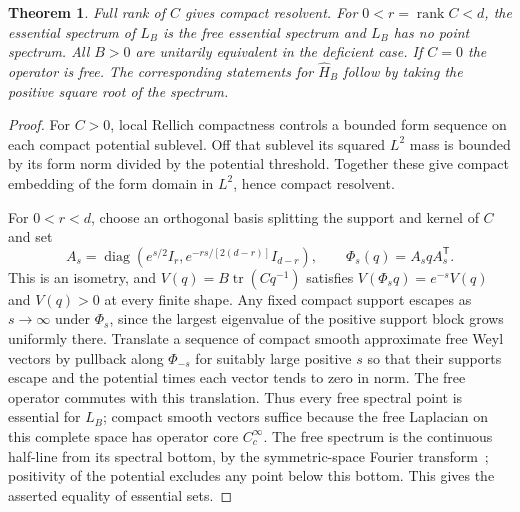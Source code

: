 \documentclass[10pt]{article}
\newtheorem{theorem}{Theorem}
\newcommand{\tr}{\operatorname{tr}}
\newcommand{\diag}{\operatorname{diag}}
\begin{document}
\begin{theorem}
Full rank of $C$ gives compact resolvent. For $0<r=\operatorname{rank} C<d$, the essential spectrum of $L_B$ is the free essential spectrum and $L_B$ has no point spectrum. All $B>0$ are unitarily equivalent in the deficient case. If $C=0$ the operator is free. The corresponding statements for $\widehat H_B$ follow by taking the positive square root of the spectrum.
\end{theorem}

\begin{proof}
For $C>0$, local Rellich compactness controls a bounded form sequence on each compact potential sublevel. Off that sublevel its squared $L^2$ mass is bounded by its form norm divided by the potential threshold. Together these give compact embedding of the form domain in $L^2$, hence compact resolvent.

For $0<r<d$, choose an orthogonal basis splitting the support and kernel of $C$ and set
\[
 A_s=\diag(e^{s/2}I_r,e^{-rs/[2(d-r)]}I_{d-r}),\qquad
 \Phi_s(q)=A_s q A_s^{\mathsf T}.
\]
This is an isometry, and $V(q)=B\tr(Cq^{-1})$ satisfies $V(\Phi_s q)=e^{-s}V(q)$ and $V(q)>0$ at every finite shape. Any fixed compact support escapes as $s\to\infty$ under $\Phi_s$, since the largest eigenvalue of the positive support block grows uniformly there. Translate a sequence of compact smooth approximate free Weyl vectors by pullback along $\Phi_{-s}$ for suitably large positive $s$ so that their supports escape and the potential times each vector tends to zero in norm. The free operator commutes with this translation. Thus every free spectral point is essential for $L_B$; compact smooth vectors suffice because the free Laplacian on this complete space has operator core $C_c^\infty$. The free spectrum is the continuous half-line from its spectral bottom, by the symmetric-space Fourier transform~\cite{Helgason}; positivity of the potential excludes any point below this bottom. This gives the asserted equality of essential sets.


\end{proof}
\end{document}
